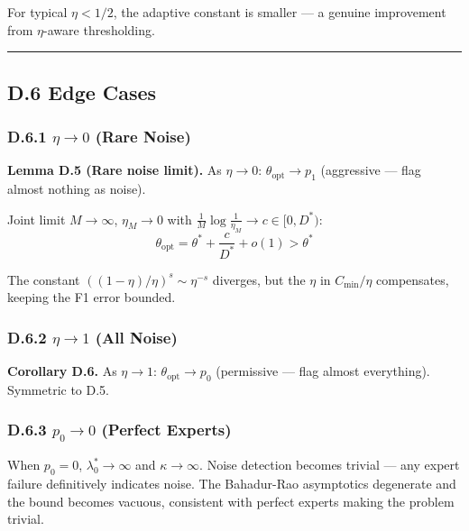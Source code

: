 \documentclass[
  12pt,
]{article}
\begin{document}
For typical \(\eta < 1/2\), the adaptive constant is smaller --- a
genuine improvement from \(\eta\)-aware thresholding.

\begin{center}\rule{0.5\linewidth}{0.5pt}\end{center}

\subsection{D.6 Edge Cases}\label{d.6-edge-cases}

\subsubsection{\texorpdfstring{D.6.1 \(\eta \to 0\) (Rare
Noise)}{D.6.1 \textbackslash eta \textbackslash to 0 (Rare Noise)}}\label{d.6.1-eta-to-0-rare-noise}

\textbf{Lemma D.5 (Rare noise limit).} As \(\eta \to 0\):
\(\theta_{\text{opt}} \to p_1\) (aggressive --- flag almost nothing as
noise).

Joint limit \(M\to\infty\), \(\eta_M \to 0\) with
\(\frac{1}{M}\log\frac{1}{\eta_M} \to c \in [0, D^*)\):
\[\theta_{\text{opt}} = \theta^* + \frac{c}{D^*} + o(1) > \theta^*\]

The constant \(((1-\eta)/\eta)^s \sim \eta^{-s}\) diverges, but the
\(\eta\) in \(C_{\min}/\eta\) compensates, keeping the F1 error bounded.

\subsubsection{\texorpdfstring{D.6.2 \(\eta \to 1\) (All
Noise)}{D.6.2 \textbackslash eta \textbackslash to 1 (All Noise)}}\label{d.6.2-eta-to-1-all-noise}

\textbf{Corollary D.6.} As \(\eta \to 1\):
\(\theta_{\text{opt}} \to p_0\) (permissive --- flag almost everything).
Symmetric to D.5.

\subsubsection{\texorpdfstring{D.6.3 \(p_0 \to 0\) (Perfect
Experts)}{D.6.3 p\_0 \textbackslash to 0 (Perfect Experts)}}\label{d.6.3-p_0-to-0-perfect-experts}

When \(p_0 = 0\), \(\lambda_0^* \to \infty\) and \(\kappa \to \infty\).
Noise detection becomes trivial --- any expert failure definitively
indicates noise. The Bahadur-Rao asymptotics degenerate and the bound
becomes vacuous, consistent with perfect experts making the problem
trivial.
\end{document}
